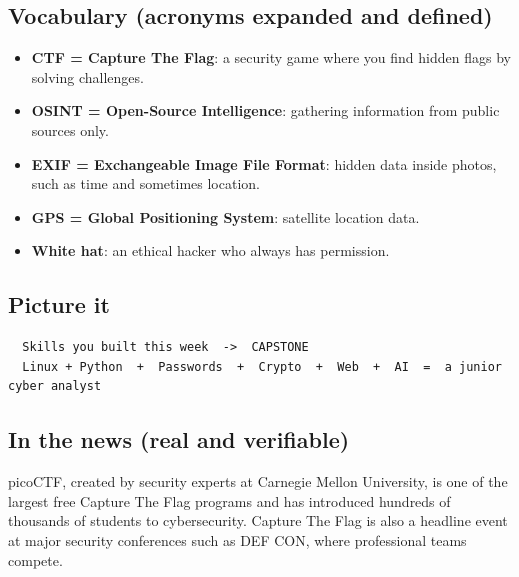 \documentclass[12pt,openany]{book}
\begin{document}
\medskip

\subsection*{Vocabulary (acronyms expanded and defined)}


\begin{itemize}

  \item \textbf{CTF = Capture The Flag}: a security game where you find hidden flags by solving challenges.

  \item \textbf{OSINT = Open-Source Intelligence}: gathering information from public sources only.

  \item \textbf{EXIF = Exchangeable Image File Format}: hidden data inside photos, such as time and sometimes location.

  \item \textbf{GPS = Global Positioning System}: satellite location data.

  \item \textbf{White hat}: an ethical hacker who always has permission.

\end{itemize}

\medskip

\subsection*{Picture it}


\begin{lstlisting}
  Skills you built this week  ->  CAPSTONE
  Linux + Python  +  Passwords  +  Crypto  +  Web  +  AI  =  a junior cyber analyst
\end{lstlisting}

\medskip

\subsection*{In the news (real and verifiable)}


picoCTF, created by security experts at Carnegie Mellon University, is one of the largest free Capture The Flag programs and has introduced hundreds of thousands of students to cybersecurity. Capture The Flag is also a headline event at major security conferences such as DEF CON, where professional teams compete.

\medskip
\end{document}
